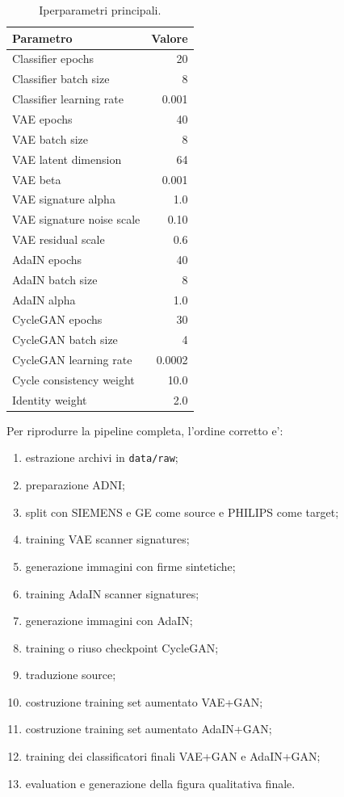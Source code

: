 \documentclass[12pt,a4paper]{article}
\begin{document}
\begin{table}[H]
\centering
\caption{Iperparametri principali.}
\begin{tabular}{lr}
\toprule
Parametro & Valore \\
\midrule
Classifier epochs & 20 \\
Classifier batch size & 8 \\
Classifier learning rate & 0.001 \\
VAE epochs & 40 \\
VAE batch size & 8 \\
VAE latent dimension & 64 \\
VAE beta & 0.001 \\
VAE signature alpha & 1.0 \\
VAE signature noise scale & 0.10 \\
VAE residual scale & 0.6 \\
AdaIN epochs & 40 \\
AdaIN batch size & 8 \\
AdaIN alpha & 1.0 \\
CycleGAN epochs & 30 \\
CycleGAN batch size & 4 \\
CycleGAN learning rate & 0.0002 \\
Cycle consistency weight & 10.0 \\
Identity weight & 2.0 \\
\bottomrule
\end{tabular}
\end{table}

Per riprodurre la pipeline completa, l'ordine corretto e':

\begin{enumerate}[leftmargin=1.2cm]
    \item estrazione archivi in \texttt{data/raw};
    \item preparazione ADNI;
    \item split con SIEMENS e GE come source e PHILIPS come target;
    \item training VAE scanner signatures;
    \item generazione immagini con firme sintetiche;
    \item training AdaIN scanner signatures;
    \item generazione immagini con AdaIN;
    \item training o riuso checkpoint CycleGAN;
    \item traduzione source;
    \item costruzione training set aumentato VAE+GAN;
    \item costruzione training set aumentato AdaIN+GAN;
    \item training dei classificatori finali VAE+GAN e AdaIN+GAN;
    \item evaluation e generazione della figura qualitativa finale.
\end{enumerate}
\end{document}
